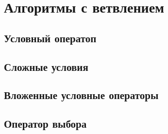 \section{Алгоритмы с ветвлением}

\subsection{Условный оператоп}

\subsection{Сложные условия}

\subsection{Вложенные условные операторы}

\subsection{Оператор выбора}
